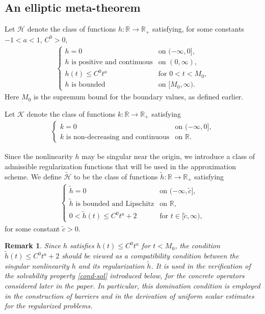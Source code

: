 \documentclass[11pt,oneside,english]{amsart}
\numberwithin{equation}{section}
\theoremstyle{plain}
\newtheorem{remark}{Remark}
\numberwithin{equation}{section}
\begin{document}
\subsection{An elliptic meta-theorem}\label{sec:el-meta}


Let $\mathcal H$ denote the class of functions
$h:\mathbb R\to\mathbb R_+$ satisfying, for some constants $-1<a<1$, $C^0>0$, 
\begin{align}
\label{eq:rhs-1}
\begin{cases}
h=0 & \text{on } (-\infty,0],\\
h \text{ is positive and continuous} & \text{on } (0,\infty),\\
h(t)\le C^0 t^a & \text{for } 0<t<M_0,\\
h \text{ is bounded}&\text{on }[M_0,\infty).
\end{cases}
\end{align}
Here $M_0$ is the supremum bound for the boundary values, as defined earlier. 



\medskip

Let $\mathcal K$ denote the class of functions
$k:\mathbb R\to\mathbb R_+$ satisfying
\begin{align}
\label{eq:rhs-2}
\begin{cases}
k=0 & \text{on } (-\infty,0],\\
k \text{ is non-decreasing and continuous} & \text{on } \mathbb R.  
\end{cases}
\end{align}

\medskip


Since the nonlinearity $h$ may be singular near the origin, we introduce a class
of admissible regularization functions that will be used in the approximation scheme. We define $\widetilde{\mathcal H}$ to be the class of functions
$\tilde h:\mathbb R\to\mathbb R_+$ satisfying
\begin{align}
\label{eq:rhs-1-1}
\begin{cases}
\tilde h=0 & \text{on } (-\infty,\tilde c],\\
\tilde h \text{ is bounded and Lipschitz} & \text{on } \mathbb R,\\
0 < \tilde h(t)\le C^0t^a+2 & \text{for } t\in
[\tilde c ,\infty),
\end{cases}
\end{align}
for some constant $\tilde c>0$.



\begin{remark}
Since $h$ satisfies $h(t)\le C^0t^a$ for $t<M_0$, the condition $\tilde h(t)\le C^0t^a+2$
should be viewed as a compatibility condition between the singular nonlinearity $h$
and its regularization $\tilde h$.
It  is used in the verification of the solvability property \ref{cond-sol} introduced below, for the
concrete operators considered later in the paper. In particular, this domination
condition is employed in the construction of barriers and in the derivation of uniform
scalar estimates for the regularized problems.
\end{remark}
\end{document}

